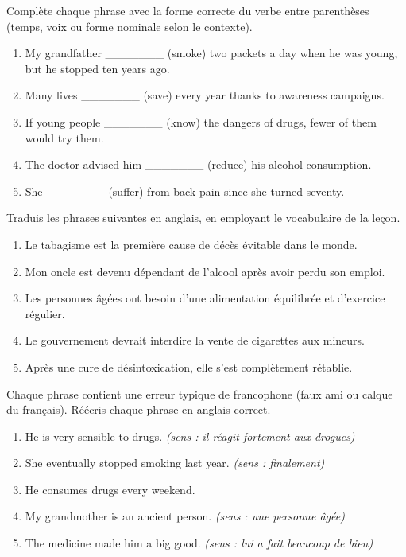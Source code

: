 \documentclass[11pt]{article}
\newcounter{popsec}
\newcounter{popsub}
\newcommand{\courssub}[1]{%
  \stepcounter{popsub}%
  \par\vspace{9pt}\noindent{\popxbold\fontsize{11.5}{13}\selectfont\color{popink}{\color{poporange}\thepopsec.\thepopsub}\hspace{6pt}#1}\par\nopagebreak\vspace{4pt}
}
\begin{document}
\begin{exercice}
Complète chaque phrase avec la forme correcte du verbe entre parenthèses (temps, voix ou forme nominale selon le contexte).
\begin{enumerate}
\item My grandfather \_\_\_\_\_\_\_ (smoke) two packets a day when he was young, but he stopped ten years ago.
\item Many lives \_\_\_\_\_\_\_ (save) every year thanks to awareness campaigns.
\item If young people \_\_\_\_\_\_\_ (know) the dangers of drugs, fewer of them would try them.
\item The doctor advised him \_\_\_\_\_\_\_ (reduce) his alcohol consumption.
\item She \_\_\_\_\_\_\_ (suffer) from back pain since she turned seventy.
\end{enumerate}
\end{exercice}

\courssub{Je m'entraîne}

\begin{exercice}
Traduis les phrases suivantes en anglais, en employant le vocabulaire de la leçon.
\begin{enumerate}
\item Le tabagisme est la première cause de décès évitable dans le monde.
\item Mon oncle est devenu dépendant de l'alcool après avoir perdu son emploi.
\item Les personnes âgées ont besoin d'une alimentation équilibrée et d'exercice régulier.
\item Le gouvernement devrait interdire la vente de cigarettes aux mineurs.
\item Après une cure de désintoxication, elle s'est complètement rétablie.
\end{enumerate}
\end{exercice}

\begin{exercice}
Chaque phrase contient une erreur typique de francophone (faux ami ou calque du français). Réécris chaque phrase en anglais correct.
\begin{enumerate}
\item He is very sensible to drugs. \emph{(sens : il réagit fortement aux drogues)}
\item She eventually stopped smoking last year. \emph{(sens : finalement)}
\item He consumes drugs every weekend.
\item My grandmother is an ancient person. \emph{(sens : une personne âgée)}
\item The medicine made him a big good. \emph{(sens : lui a fait beaucoup de bien)}
\end{enumerate}
\end{exercice}
\end{document}

